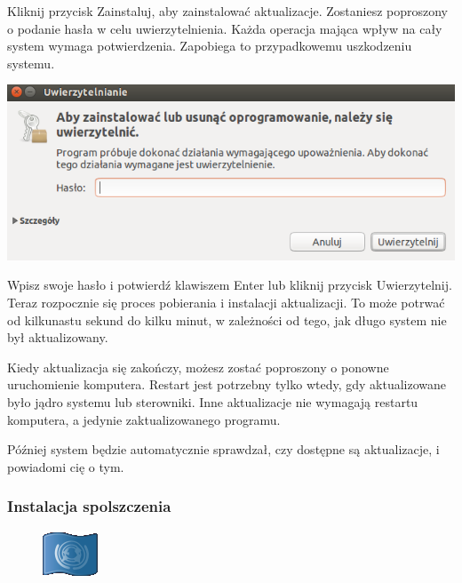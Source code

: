 Kliknij przycisk \textcolor{ubuntu_orange}{Zainstaluj}, aby zainstalować aktualizacje. Zostaniesz poproszony o podanie hasła w celu uwierzytelnienia. Każda operacja mająca wpływ na cały system wymaga potwierdzenia. Zapobiega to przypadkowemu uszkodzeniu systemu.
\begin{center}
	\includegraphics{images/unity_uwierzytelnienie.png}
\end{center}

Wpisz swoje hasło i potwierdź klawiszem Enter lub kliknij przycisk \textcolor{ubuntu_orange}{Uwierzytelnij}. Teraz rozpocznie się proces pobierania i instalacji aktualizacji. To może potrwać od kilkunastu sekund do kilku minut, w zależności od tego, jak długo system nie był aktualizowany.

Kiedy aktualizacja się zakończy, możesz zostać poproszony o ponowne uruchomienie komputera. Restart jest potrzebny tylko wtedy, gdy aktualizowane było jądro systemu lub sterowniki. Inne aktualizacje nie wymagają restartu komputera, a jedynie zaktualizowanego programu.

Później system będzie automatycznie sprawdzał, czy dostępne są aktualizacje, i powiadomi cię o tym.
\clearpage
\subsubsection{Instalacja spolszczenia}
\begin{figure}
	\vspace{-10pt}
	\includegraphics[width=\linewidth]{images/pierwsze_uruchomienie_lang1.png}
\end{figure}

